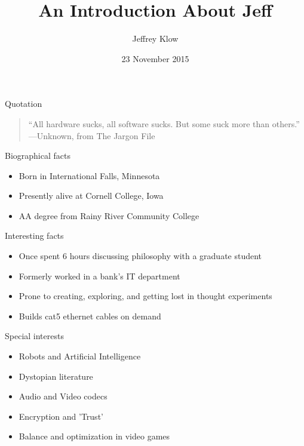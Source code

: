 \documentclass{beamer}
\title{An Introduction About Jeff}
\author{Jeffrey Klow}
\institute{Cornell College}
\date{23 November 2015}
\begin{document}
\begin{frame}
  \titlepage
\end{frame}

\begin{frame}{Quotation}
\begin{quotation}
\noindent
``All hardware sucks, all software sucks.  But some suck more than others.''
  \flushright
  ---Unknown, from The Jargon File
  \end{quotation}
\end{frame}

\begin{frame}{Biographical facts}
\begin{itemize}
  \item Born in International Falls, Minnesota
  \item Presently alive at Cornell College, Iowa
  \item AA degree from Rainy River Community College
  \end{itemize}
\end{frame}

\begin{frame}{Interesting facts}
\begin{itemize}
  \item Once spent 6 hours discussing philosophy with a graduate student
  \item Formerly worked in a bank's IT department
  \item Prone to creating, exploring, and getting lost in thought experiments
  \item Builds cat5 ethernet cables on demand
  \end{itemize}
\end{frame}

\begin{frame}{Special interests}
\begin{itemize}
  \item Robots and Artificial Intelligence
  \item Dystopian literature
  \item Audio and Video codecs
  \item Encryption and 'Trust'
  \item Balance and optimization in video games
  \end{itemize}
\end{frame}
\end{document}
